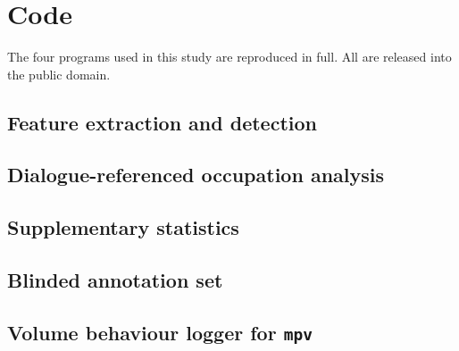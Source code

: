 \chapter{Code}
\label{app:code}

The four programs used in this study are reproduced in full. All are released into the public domain.

\section{Feature extraction and detection}


\section{Dialogue-referenced occupation analysis}


\section{Supplementary statistics}


\section{Blinded annotation set}


\section{Volume behaviour logger for \texttt{mpv}}

